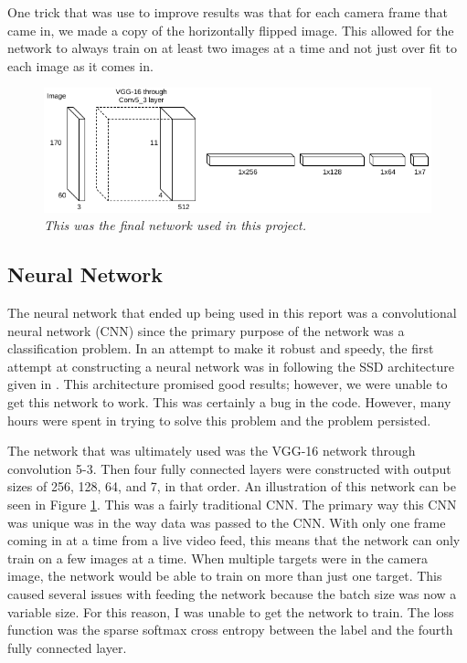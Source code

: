 \documentclass[letterpaper, 10 pt, conference]{ieeeconf}  %
\begin{document}
One trick that was use to improve results was that for each camera frame that came in, we made a copy of the horizontally flipped image. This allowed for the network to always train on at least two images at a time and not just over fit to each image as it comes in. 

\begin{figure}
	\begin{center}
		\includegraphics[width=.95\textwidth]{cnn.png}
		\caption{\textit{This was the final network used in this project.}} 
		\label{fig:cnn}
	\end{center}
\end{figure}

\subsection{Neural Network}

The neural network that ended up being used in this report was a convolutional neural network (CNN) since the primary purpose of the network was a classification problem. In an attempt to make it robust and speedy, the first attempt at constructing a neural network was in following the SSD architecture given in \cite{liu2016ssd}. This architecture promised good results; however, we were unable to get this network to work. This was certainly a bug in the code. However, many hours were spent in trying to solve this problem and the problem persisted. 

The network that was ultimately used was the VGG-16 network through convolution 5-3. Then four fully connected layers were constructed with output sizes of 256, 128, 64, and 7, in that order. An illustration of this network can be seen in Figure \ref{fig:cnn}. This was a fairly traditional CNN. The primary way this CNN was unique was in the way data was passed to the CNN. With only one frame coming in at a time from a live video feed, this means that the network can only train on a few images at a time. When multiple targets were in the camera image, the network would be able to train on more than just one target. This caused several issues with feeding the network because the batch size was now a variable size. For this reason, I was unable to get the network to train. The loss function was the sparse softmax cross entropy between the label and the fourth fully connected layer.
\end{document}
